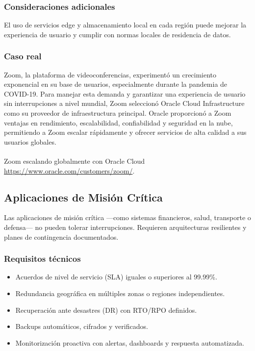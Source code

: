 {            \subsubsection{Consideraciones adicionales}
                El uso de servicios edge y almacenamiento local en cada región puede mejorar la experiencia de usuario y cumplir con normas locales de residencia de datos.

            \subsubsection{Caso real}
                Zoom, la plataforma de videoconferencias, experimentó un crecimiento exponencial en su base de usuarios, especialmente durante la pandemia de COVID-19. Para manejar esta demanda y garantizar una experiencia de usuario sin interrupciones a nivel mundial, Zoom seleccionó Oracle Cloud Infrastructure como su proveedor de infraestructura principal. Oracle proporcionó a Zoom ventajas en rendimiento, escalabilidad, confiabilidad y seguridad en la nube, permitiendo a Zoom escalar rápidamente y ofrecer servicios de alta calidad a sus usuarios globales. 
                
                \paragraph{}Zoom escalando globalmente con Oracle Cloud \href{https://www.oracle.com/customers/zoom/}{https://www.oracle.com/customers/zoom/}.

        \subsection{Aplicaciones de Misión Crítica}
            Las aplicaciones de misión crítica —como sistemas financieros, salud, transporte o defensa— no pueden tolerar interrupciones. Requieren arquitecturas resilientes y planes de contingencia documentados.
                
            \subsubsection{Requisitos técnicos}
                \begin{itemize}
                    \item Acuerdos de nivel de servicio (SLA) iguales o superiores al 99.99\%.
                    \item Redundancia geográfica en múltiples zonas o regiones independientes.
                    \item Recuperación ante desastres (DR) con RTO/RPO definidos.
                    \item Backups automáticos, cifrados y verificados.
                    \item Monitorización proactiva con alertas, dashboards y respuesta automatizada.
                \end{itemize}
                
}
